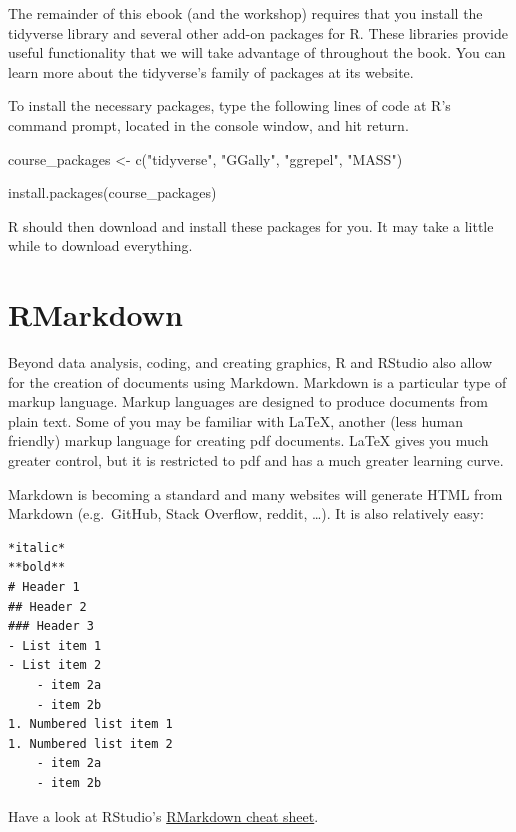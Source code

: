 \documentclass[
]{book}
\newenvironment{Shaded}{\begin{snugshade}}{\end{snugshade}}
\newcommand{\FunctionTok}[1]{\textcolor[rgb]{0.00,0.00,0.00}{#1}}
\newcommand{\NormalTok}[1]{#1}
\newcommand{\OtherTok}[1]{\textcolor[rgb]{0.56,0.35,0.01}{#1}}
\newcommand{\StringTok}[1]{\textcolor[rgb]{0.31,0.60,0.02}{#1}}
\begin{document}
The remainder of this ebook (and the workshop) requires that you install the tidyverse library and several other add-on packages for R. These libraries provide useful functionality that we will take advantage of throughout the book. You can learn more about the tidyverse's family of packages at its website.

To install the necessary packages, type the following lines of code at R's command prompt, located in the console window, and hit return.

\begin{Shaded}
\begin{Highlighting}[]
\NormalTok{course\_packages }\OtherTok{\textless{}{-}} \FunctionTok{c}\NormalTok{(}\StringTok{"tidyverse"}\NormalTok{, }\StringTok{"GGally"}\NormalTok{, }\StringTok{"ggrepel"}\NormalTok{, }\StringTok{"MASS"}\NormalTok{)}

\FunctionTok{install.packages}\NormalTok{(course\_packages)}
\end{Highlighting}
\end{Shaded}

R should then download and install these packages for you. It may take a little while to download everything.

\hypertarget{rmarkdown}{%
\section{RMarkdown}\label{rmarkdown}}

Beyond data analysis, coding, and creating graphics, R and RStudio also allow for the creation of documents using Markdown. Markdown is a particular type of markup language. Markup languages are designed to produce documents from plain text. Some of you may be familiar with LaTeX, another (less human friendly) markup language for creating pdf documents. LaTeX gives you much greater control, but it is restricted to pdf and has a much greater learning curve.

Markdown is becoming a standard and many websites will generate HTML from Markdown (e.g.~GitHub, Stack Overflow, reddit, \ldots). It is also relatively easy:

\begin{verbatim}
*italic*
**bold**
# Header 1
## Header 2
### Header 3
- List item 1
- List item 2
    - item 2a
    - item 2b
1. Numbered list item 1
1. Numbered list item 2
    - item 2a
    - item 2b
\end{verbatim}

Have a look at RStudio's \href{https://www.rstudio.com/resources/cheatsheets/}{RMarkdown cheat sheet}.
\end{document}
